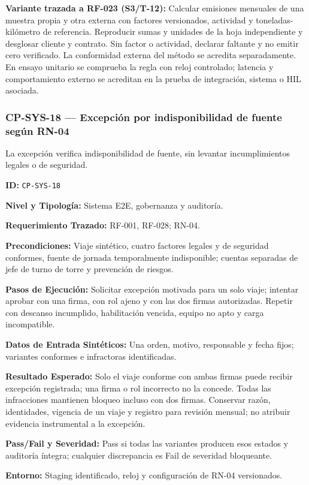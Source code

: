 \par\noindent\textbf{Variante trazada a RF-023 (S3/T-12):} Calcular emisiones mensuales de una muestra propia y otra externa con factores versionados, actividad y toneladas-kilómetro de referencia. Reproducir sumas y unidades de la hoja independiente y desglosar cliente y contrato. Sin factor o actividad, declarar faltante y no emitir cero verificado. La conformidad externa del método se acredita separadamente. En ensayo unitario se comprueba la regla con reloj controlado; latencia y comportamiento externo se acreditan en la prueba de integración, sistema o HIL asociada.\par
\subsubsection*{CP-SYS-18 — Excepción por indisponibilidad de fuente según RN-04}\label{sec:9-cp-sys-18}
La excepción verifica indisponibilidad de fuente, sin levantar incumplimientos legales o de seguridad.
\par\noindent \textbf{ID:} \texttt{CP-\allowbreak{}SYS-\allowbreak{}18}\par
\par\noindent \textbf{Nivel y Tipología:} Sistema E2E, gobernanza y auditoría.\par
\par\noindent \textbf{Requerimiento Trazado:} RF-001, RF-028; RN-04.\par
\par\noindent \textbf{Precondiciones:} Viaje sintético, cuatro factores legales y de seguridad conformes, fuente de jornada temporalmente indisponible; cuentas separadas de jefe de turno de torre y prevención de riesgos.\par
\par\noindent \textbf{Pasos de Ejecución:} Solicitar excepción motivada para un solo viaje; intentar aprobar con una firma, con rol ajeno y con las dos firmas autorizadas. Repetir con descanso incumplido, habilitación vencida, equipo no apto y carga incompatible.\par
\par\noindent \textbf{Datos de Entrada Sintéticos:} Una orden, motivo, responsable y fecha fijos; variantes conformes e infractoras identificadas.\par
\par\noindent \textbf{Resultado Esperado:} Solo el viaje conforme con ambas firmas puede recibir excepción registrada; una firma o rol incorrecto no la concede. Todas las infracciones mantienen bloqueo incluso con dos firmas. Conservar razón, identidades, vigencia de un viaje y registro para revisión mensual; no atribuir evidencia instrumental a la excepción.\par
\par\noindent \textbf{Pass/Fail y Severidad:} Pass si todas las variantes producen esos estados y auditoría íntegra; cualquier discrepancia es Fail de severidad bloqueante.\par
\par\noindent \textbf{Entorno:} Staging identificado, reloj y configuración de RN-04 versionados.\par


